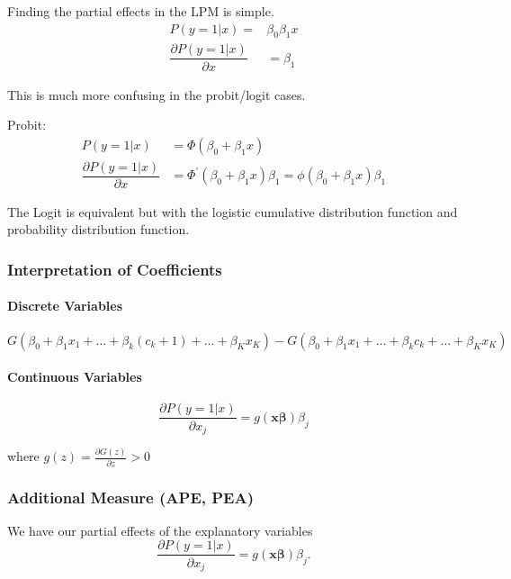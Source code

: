 \documentclass[11pt]{article}
\begin{document}
\begin{procedure}
    Finding the partial effects in the LPM is simple.
    \begin{align*}
        P(y=1|x) =& \beta_0 \beta_1 x \\
        \dfrac{\partial P(y=1|x)}{\partial x} &= \beta_1
    \end{align*}

    This is much more confusing in the probit/logit cases.
    
    Probit:
    \begin{align*}
        P(y=1|x) &= \Phi(\beta_0 + \beta_1 x) \\
        \dfrac{\partial P(y=1|x)}{\partial x} &= \Phi^\prime (\beta_0 + \beta_1 x)\beta_1 = \phi(\beta_0 + \beta_1 x)\beta_1 
    \end{align*}

    The Logit is equivalent but with the logistic cumulative distribution function and probability distribution function.
\end{procedure}

\subsubsection{Interpretation of Coefficients}

\paragraph{Discrete Variables}\mbox{}

\[G(\beta_0 + \beta_1 x_1 + \ldots + \beta_k (c_k + 1) + \ldots + \beta_K x_K) - G(\beta_0 + \beta_1 x_1 + \ldots + \beta_k c_k + \ldots + \beta_K x_K)\]

\paragraph{Continuous Variables} \mbox{}

\[\dfrac{\partial P(y=1|x)}{\partial x_j} = g(\boldsymbol{x\beta})\beta_j\]

where $g(z) = \frac{\partial G(z)}{\partial z} >0$

\subsubsection{Additional Measure (APE, PEA)}

We have our partial effects of the explanatory variables
\[\dfrac{\partial P(y=1|x)}{\partial x_j} = g(\boldsymbol{x\beta})\beta_j.\]
\end{document}
